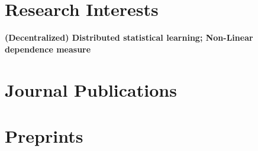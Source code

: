 \documentclass[margin,line]{resume-bib}
\begin{document}
\begin{resume}
\section{\mysidestyle Research Interests}\vspace{1mm}	
    {\bf (Decentralized) Distributed statistical learning; Non-Linear dependence measure} 



\section{\mysidestyle Journal Publications}\vspace{1mm}	
\begin{refsection} %
\nocite{chen2022DistributedDecodingHeterogeneous,chen2022DistributedEstimationHeterogeneous,chen2024DistributedSparseComposite,zhang2022SlicedIndependenceTest,Song2020,he2022DistributedEstimationHigh,chen2022ScalableGloballyConvergent,chen2022FastOptimizationMethods}

\printbibliography[heading=none]
\end{refsection}

\section{\mysidestyle Preprints}
\begin{refsection} %
\nocite{chen2022RobustMultiTask,chen2022DistributedEstimationGap,chen2022DecentralizedDistributedEstimation,chen2022RobustFastLowRank,chen2022CommunicationEfficientDistributedSupportVectorMachine}

\printbibliography[heading=none]
\end{refsection}



\end{resume}
\end{document}
